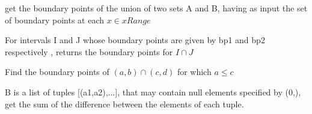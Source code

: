 \documentclass[letterpaper,10pt,english]{sphinxmanual}
\begin{document}

\begin{fulllineitems}
\label{Analisis/Auxiliaryfunctions:Auxiliaryfunctions.GetPositiveRegions}
\end{fulllineitems}


\begin{fulllineitems}
\label{Analisis/Auxiliaryfunctions:Auxiliaryfunctions.GetUnion}
get the boundary points of the union of two sets A and B, having as input the set of boundary points at each \(x \in xRange\)

\end{fulllineitems}


\begin{fulllineitems}
\label{Analisis/Auxiliaryfunctions:Auxiliaryfunctions.Intersection}
For intervals I and J whose boundary points are given by bp1 and bp2 respectively , returns the boundary points for \(I \cap J\)

\end{fulllineitems}


\begin{fulllineitems}
\label{Analisis/Auxiliaryfunctions:Auxiliaryfunctions.IntervalInt}
Find the boundary points of \((a,b) \cap (c,d)\) for which \(a \leq c\)

\end{fulllineitems}


\begin{fulllineitems}
\label{Analisis/Auxiliaryfunctions:Auxiliaryfunctions.SumBound}
B is a list of tuples {[}(a1,a2),...{]}, that may contain null elements specified by (0,), get the sum of the difference between the elements of each tuple.

\end{fulllineitems}
\end{document}
